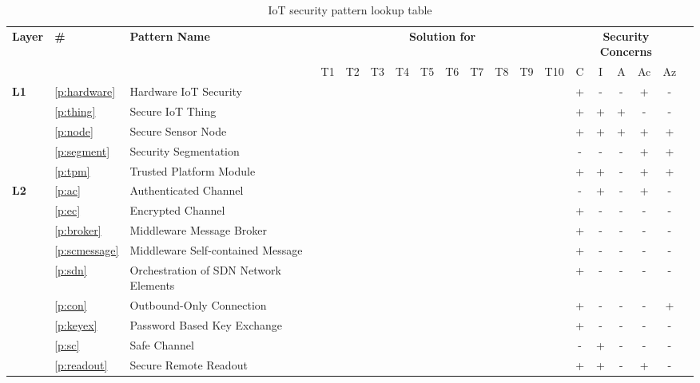 \begin{landscape}
\begin{longtable}[c]{lllcccccccccccccccc}
	\caption{IoT security pattern lookup table}
	\label{tab:patterns} \\
	\hline
	\textbf{Layer} & \textbf{\#} & \textbf{Pattern Name} & \multicolumn{10}{c}{\textbf{Solution for}} & \multicolumn{5}{c}{\textbf{Security Concerns}} \\
	& & & T1 & T2 & T3 & T4 & T5 & T6 & T7 & T8 & T9 & T10 & C & I & A & Ac & Az \\
	\hline
	\endhead
	\multirow{5}{*}{\textbf{L1}} & \ref{p:hardware} & Hardware IoT Security & & \checkmark & & \checkmark & \checkmark & & & & & & + & - & - & + & - \\
	& \ref{p:thing} & Secure IoT Thing & & \checkmark & \checkmark & & & & \checkmark & & & & + & + & + & - & - \\
	& \ref{p:node} & Secure Sensor Node & & & \checkmark & & \checkmark & & \checkmark & & & & + & + & + & + & + \\
	& \ref{p:segment} & Security Segmentation & & & \checkmark & & & & & & & & - & - & - & + & + \\
	& \ref{p:tpm} & Trusted Platform Module & & & & & \checkmark & & \checkmark & & & & + & + & - & + & + \\
	\hline
	\multirow{14}{*}{\textbf{L2}} & \ref{p:ac} & Authenticated Channel & & \checkmark & & & & & \checkmark & & & & - & + & - & + & - \\ 
	& \ref{p:ec} & Encrypted Channel & & \checkmark & & & & & \checkmark & & & & + & - & - & - & - \\
	& \ref{p:broker} & Middleware Message Broker & & & \checkmark & & & & \checkmark & & & & + & - & - & - & - \\
	& \ref{p:scmessage} & Middleware Self-contained Message & & & & & & & \checkmark & & & & + & - & - & - & - \\
	& \ref{p:sdn} & Orchestration of SDN Network Elements & & & \checkmark & & & & \checkmark & & & & + & - & - & - & - \\
	& \ref{p:con} & Outbound-Only Connection & & & & & & \checkmark & \checkmark & & & & + & - & - & - & + \\
	& \ref{p:keyex} & Password Based Key Exchange & \checkmark & & & & & & \checkmark & & & & + & - & - & - & - \\
	& \ref{p:sc} & Safe Channel & & \checkmark & & & & & \checkmark & & & & - & + & - & - & - \\  
	& \ref{p:readout} & Secure Remote Readout & & & & & & & \checkmark & & & & + & + & - & + & - \\  

\end{longtable}
\end{landscape}
